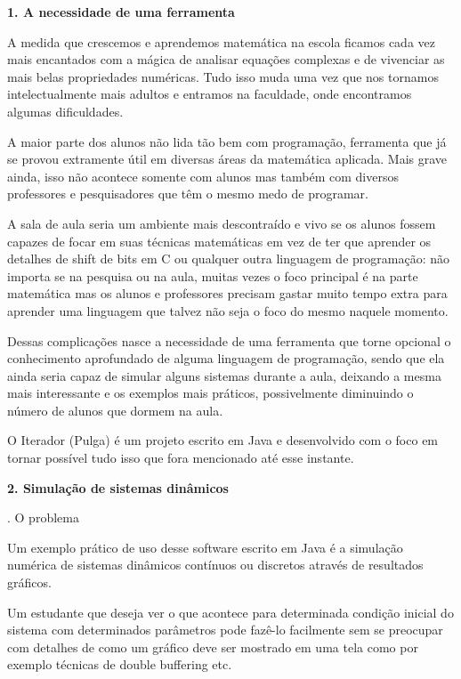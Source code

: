 \documentclass[a4paper,12pt]{article}
\begin{document}
{\bfseries
1. A necessidade de uma ferramenta}

{
A medida que crescemos e aprendemos matem\'atica na escola ficamos cada
vez mais encantados com a m\'agica de analisar equa\c{c}\~oes complexas
e de vivenciar as mais belas propriedades num\'ericas. Tudo isso muda
uma vez que nos tornamos intelectualmente mais adultos e entramos na
faculdade, onde encontramos algumas dificuldades.}

{
 A maior parte dos alunos n\~ao lida t\~ao bem com programa\c{c}\~ao,
ferramenta que j\'a se provou extramente \'util em diversas \'areas da
matem\'atica aplicada. Mais grave ainda, isso n\~ao acontece somente
com alunos mas tamb\'em com diversos professores e pesquisadores que
t\^em o mesmo medo de programar.}

{
 A sala de aula seria um ambiente mais descontra\'ido e vivo se os
alunos fossem capazes de focar em suas t\'ecnicas matem\'aticas em vez
de ter que aprender os detalhes de shift de bits em C ou qualquer outra
linguagem de programa\c{c}\~ao: n\~ao importa se na pesquisa ou na
aula, muitas vezes o foco principal \'e na parte matem\'atica mas os
alunos e professores precisam gastar muito tempo extra para aprender
uma linguagem que talvez n\~ao seja o foco do mesmo naquele momento.}

{
 Dessas complica\c{c}\~oes nasce a necessidade de uma ferramenta que
torne opcional o conhecimento aprofundado de alguma linguagem de
programa\c{c}\~ao, sendo que ela ainda seria capaz de simular alguns
sistemas durante a aula, deixando a mesma mais interessante e os
exemplos mais pr\'aticos, possivelmente diminuindo o n\'umero de alunos
que dormem na aula.}

{
 O Iterador (Pulga) \'e um projeto escrito em Java e desenvolvido com o
foco em tornar poss\'ivel tudo isso que fora mencionado at\'e esse
instante.}

{\bfseries
2. Simula\c{c}\~ao de sistemas din\^amicos}

{. O problema}

{
Um exemplo pr\'atico de uso desse software escrito em Java \'e a
simula\c{c}\~ao num\'erica de sistemas din\^amicos cont\'inuos ou
discretos atrav\'es de resultados gr\'aficos.}

{
 Um estudante que deseja ver o que acontece para determinada
condi\c{c}\~ao inicial do sistema com determinados par\^ametros pode
faz\^e{}-lo facilmente sem se preocupar com detalhes de como um
gr\'afico deve ser mostrado em uma tela como por exemplo t\'ecnicas de
double buffering etc.}
\end{document}
